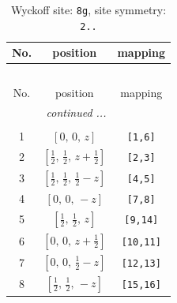 \documentclass[fleqn,8pt]{jsarticle}
\begin{document}
\renewcommand{\arraystretch}{1.2}
\begin{longtable}{ccc}
\caption{Wyckoff site: {\tt 8g}, site symmetry: {\tt 2..}}
 \\
 \hline \hline
No. & position & mapping \\ \hline \endfirsthead

\multicolumn{2}{l}{\tablename\ \thetable{}} \\
 \hline \hline
No. & position & mapping \\ \hline \endhead

 \hline \hline
\multicolumn{2}{r}{\footnotesize\it continued ...} \\ \endfoot

 \hline \hline
\multicolumn{2}{r}{} \\ \endlastfoot

1 & $\left[ 0,\, 0,\, z \right]$ & {\tt [1,6]} \\ \hline
2 & $\left[ \frac{1}{2},\, \frac{1}{2},\, z + \frac{1}{2} \right]$ & {\tt [2,3]} \\ \hline
3 & $\left[ \frac{1}{2},\, \frac{1}{2},\, \frac{1}{2} - z \right]$ & {\tt [4,5]} \\ \hline
4 & $\left[ 0,\, 0,\, - z \right]$ & {\tt [7,8]} \\ \hline
5 & $\left[ \frac{1}{2},\, \frac{1}{2},\, z \right]$ & {\tt [9,14]} \\ \hline
6 & $\left[ 0,\, 0,\, z + \frac{1}{2} \right]$ & {\tt [10,11]} \\ \hline
7 & $\left[ 0,\, 0,\, \frac{1}{2} - z \right]$ & {\tt [12,13]} \\ \hline
8 & $\left[ \frac{1}{2},\, \frac{1}{2},\, - z \right]$ & {\tt [15,16]} \\
\end{longtable}
\renewcommand{\arraystretch}{1.2}
\end{document}
